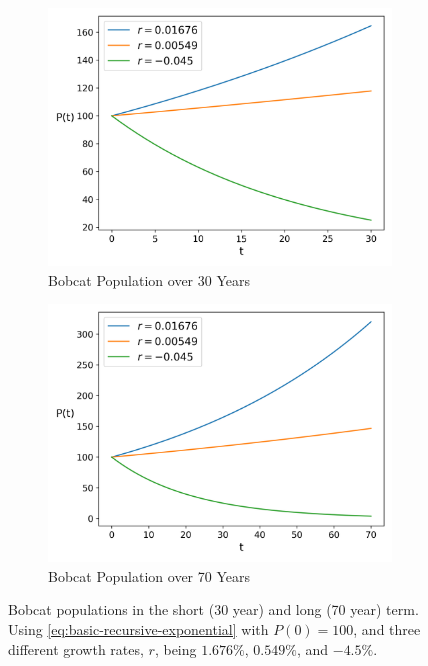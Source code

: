 \documentclass{article}
\begin{document}
\begin{figure}[h]
    \centering
    \begin{subfigure}{.5\textwidth}
        \centering
        \includegraphics[width=.95\linewidth]{./basic/short_term.png}
        \caption{Bobcat Population over 30 Years}
        \label{fig:basic-short-term}
    \end{subfigure}%
    \begin{subfigure}{.5\textwidth}
        \centering
        \includegraphics[width=.95\linewidth]{./basic/long_term.png}
        \caption{Bobcat Population over 70 Years}
        \label{fig:basic-long-term}
    \end{subfigure}
    \caption{Bobcat populations in the short (30 year) and long (70 year) term. Using \cref{eq:basic-recursive-exponential} with $P(0) = 100$, and three different growth rates, $r$, being $1.676\%$, $0.549\%$, and $-4.5\%$.}
    \label{fig:1}
\end{figure}
\end{document}
